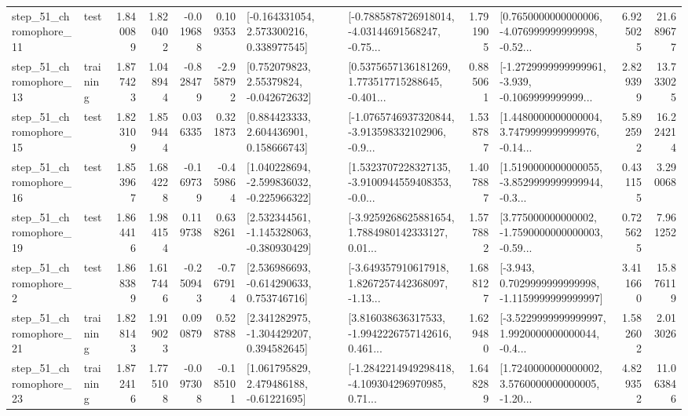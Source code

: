 \begin{tabular}{llrrrrllrlrr}
   step\_51\_chromophore\_11 &      test &      1.840089 &    1.820402 &     -0.019688 &  0.109353 &    [-0.164331054, 2.573300216, 0.338977545] &  [-0.7885878726918014, -4.03144691568247, -0.75... &       1.791905 &  [0.7650000000000006, -4.076999999999998, -0.52... &            6.925025 &         21.689677 \\
   step\_51\_chromophore\_13 &  training &      1.877423 &    1.048944 &     -0.828479 & -2.958792 &     [0.752079823, 2.55379824, -0.042672632] &  [0.5375657136181269, 1.773517715288645, -0.401... &       0.885061 &  [-1.2729999999999961, -3.939, -0.1069999999999... &            2.829399 &         13.733025 \\
   step\_51\_chromophore\_15 &      test &      1.823109 &    1.859444 &      0.036335 &  0.321873 &     [0.884423333, 2.604436901, 0.158666743] &  [-1.0765746937320844, -3.913598332102906, -0.9... &       1.538787 &  [1.4480000000000004, 3.7479999999999976, -0.14... &            5.892592 &         16.224214 \\
   step\_51\_chromophore\_16 &      test &      1.853967 &    1.684228 &     -0.169739 & -0.459864 &   [1.040228694, -2.599836032, -0.225966322] &  [1.5323707228327135, -3.9100944559408353, -0.0... &       1.407887 &  [1.5190000000000055, -3.8529999999999944, -0.3... &            0.431155 &          3.290068 \\
   step\_51\_chromophore\_19 &      test &      1.864416 &    1.984154 &      0.119738 &  0.638261 &   [2.532344561, -1.145328063, -0.380930429] &  [-3.9259268625881654, 1.7884980142333127, 0.01... &       1.577882 &  [3.775000000000002, -1.7590000000000003, -0.59... &            0.725625 &          7.961252 \\
    step\_51\_chromophore\_2 &      test &      1.868389 &    1.617446 &     -0.250943 & -0.767914 &    [2.536986693, -0.614290633, 0.753746716] &  [-3.649357910617918, 1.8267257442368097, -1.13... &       1.688127 &  [-3.943, 0.7029999999999998, -1.1159999999999997] &            3.411660 &         15.876119 \\
   step\_51\_chromophore\_21 &  training &      1.828143 &    1.919023 &      0.090879 &  0.528788 &    [2.341282975, -1.304429207, 0.394582645] &  [3.816038636317533, -1.9942226757142616, 0.461... &       1.629480 &  [-3.5229999999999997, 1.9920000000000044, -0.4... &            1.582602 &          2.013026 \\
   step\_51\_chromophore\_23 &  training &      1.872416 &    1.775108 &     -0.097308 & -0.185101 &     [1.061795829, 2.479486188, -0.61221695] &  [-1.2842214949298418, -4.109304296970985, 0.71... &       1.648289 &  [1.7240000000000002, 3.5760000000000005, -1.20... &            4.829352 &         11.063846 \\

\end{tabular}
